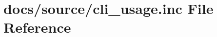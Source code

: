 \hypertarget{cli__usage_8inc}{}\section{docs/source/cli\+\_\+usage.inc File Reference}
\label{cli__usage_8inc}
